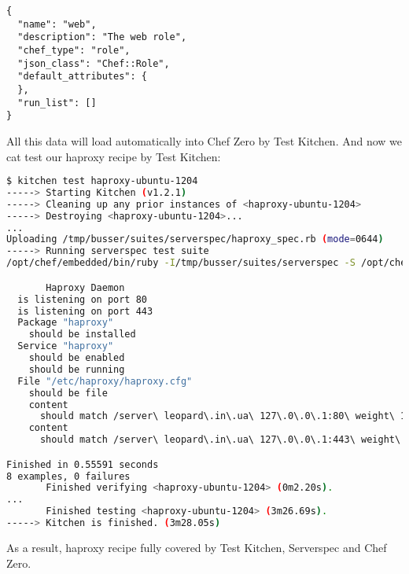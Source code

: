 \begin{lstlisting}[label=lst:testing-chef-zero22]
{
  "name": "web",
  "description": "The web role",
  "chef_type": "role",
  "json_class": "Chef::Role",
  "default_attributes": {
  },
  "run_list": []
}
\end{lstlisting}

All this data will load automatically into Chef Zero by Test Kitchen. And now we cat test our haproxy recipe by Test Kitchen:

\begin{lstlisting}[language=Bash,label=lst:testing-chef-zero23]
$ kitchen test haproxy-ubuntu-1204
-----> Starting Kitchen (v1.2.1)
-----> Cleaning up any prior instances of <haproxy-ubuntu-1204>
-----> Destroying <haproxy-ubuntu-1204>...
...
Uploading /tmp/busser/suites/serverspec/haproxy_spec.rb (mode=0644)
-----> Running serverspec test suite
/opt/chef/embedded/bin/ruby -I/tmp/busser/suites/serverspec -S /opt/chef/embedded/bin/rspec /tmp/busser/suites/serverspec/haproxy_spec.rb --color --format documentation

       Haproxy Daemon
  is listening on port 80
  is listening on port 443
  Package "haproxy"
    should be installed
  Service "haproxy"
    should be enabled
    should be running
  File "/etc/haproxy/haproxy.cfg"
    should be file
    content
      should match /server\ leopard\.in\.ua\ 127\.0\.0\.1:80\ weight\ 1\ maxconn\ 1024\ check/
    content
      should match /server\ leopard\.in\.ua\ 127\.0\.0\.1:443\ weight\ 1\ maxconn\ 1024\ check/

Finished in 0.55591 seconds
8 examples, 0 failures
       Finished verifying <haproxy-ubuntu-1204> (0m2.20s).
...
       Finished testing <haproxy-ubuntu-1204> (3m26.69s).
-----> Kitchen is finished. (3m28.05s)
\end{lstlisting}

As a result, haproxy recipe fully covered by Test Kitchen, Serverspec and Chef Zero.